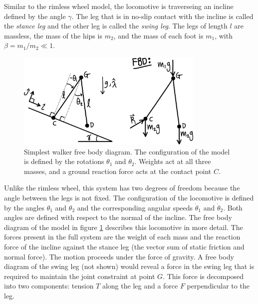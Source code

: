 Similar to the rimless wheel model, the locomotive is traverseing an incline defined by the angle $\gamma$. The leg that is in no-slip contact with the incline is called the \textit{stance leg} and the other leg is called the \textit{swing leg}. The legs of length $l$ are massless, the mass of the hips is $m_{2}$, and the mass of each foot is $m_{1}$, with $\beta = m_{1} / m_{2} \ll 1$.

\begin{figure}[h]		%
\begin{centering}
\includegraphics[width=0.8\textwidth]{Figures/SimplestWalkerFBD}\par
\end{centering}
\caption[Diagram: Simplest Walker Free Body Diagram]{Simplest walker free body diagram. The configuration of the model is defined by the rotations $\theta_{1}$ and $\theta_{2}$. Weights act at all three masses, and a ground reaction force acts at the contact point $C$.}
\label{fig:SimplestWalkerFBD}
\end{figure}
%

Unlike the rimless wheel, this system has two degrees of freedom because the angle between the legs is not fixed. The configuration of the locomotive is defined by the angles $\theta_1$ and $\theta_2$ and the corresponding angular speeds $\dot{\theta}_1$ and $\dot{\theta}_2$. Both angles are defined with respect to the normal of the incline. The free body diagram of the model in figure \ref{fig:SimplestWalkerFBD} describes this locomotive in more detail. The forces present in the full system are the weight of each mass and the reaction force of the incline against the stance leg (the vector sum of static friction and normal force). The motion proceeds under the force of gravity. A free body diagram of the swing leg (not shown) would reveal a force in the swing leg that is required to maintain the joint constraint at point $G$. This force is decomposed into two components: tension $T$ along the leg and a force $F$ perpendicular to the leg. 

